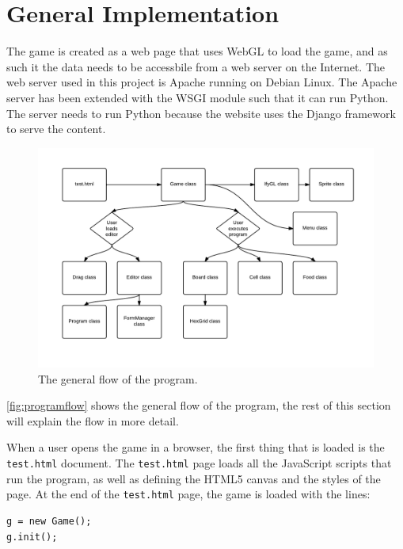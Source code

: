 \section{General Implementation}
The game is created as a web page that uses WebGL to load the game, and as such it the data needs to be accessbile from a web server on the Internet. The web server used in this project is Apache running on Debian Linux. The Apache server has been extended with the WSGI module such that it can run Python. The server needs to run Python because the website uses the Django framework to serve the content.

\begin{figure}[ht]
\begin{adjustwidth}{-5em}{-5em}
\includegraphics[width=1.3\textwidth]{img/Program_flow.pdf}
\caption{The general flow of the program.}
\label{fig:programflow}
\end{adjustwidth}
\end{figure}

\autoref{fig:programflow} shows the general flow of the program, the rest of this section will explain the flow in more detail.\newline

When a user opens the game in a browser, the first thing that is loaded is the \texttt{test.html} document. The \texttt{test.html} page loads all the JavaScript scripts that run the program, as well as defining the HTML5 canvas and the styles of the page. At the end of the \texttt{test.html} page, the game is loaded with the lines: 

\begin{lstlisting}
g = new Game();
g.init();
\end{lstlisting}

